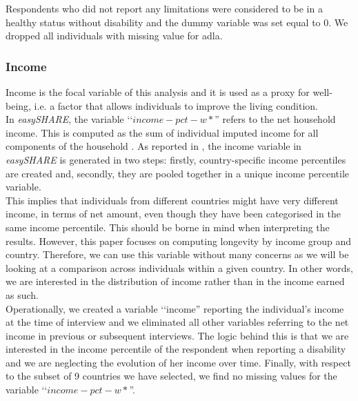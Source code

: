 Respondents who did not report any limitations were considered to be in a healthy status without disability and the dummy variable was set equal to 0. We dropped all individuals with missing value for adla.

\subsubsection{Income}

Income is the focal variable of this analysis and it is used as a proxy for well-being, i.e. a factor that allows individuals to improve the living condition.\\



In \textit{easySHARE}, the variable \lq\lq $income-pct-w*$'' refers to the net household income. This is computed as the sum of individual imputed income for all components of the household \citep{Adeline2016SomeIncome}. 
As reported in \cite{Gruber2014GeneratingProgramming}, the income variable in \textit{easySHARE} is generated in two steps: firstly, country-specific income percentiles are created and, secondly, they are pooled together in a unique income percentile variable.\\

This implies that individuals from different countries might have very different income, in terms of net amount, even though they have been categorised in the same income percentile. This should be borne in mind when interpreting the results.
However, this paper focuses on computing longevity by income group and country. Therefore, we can use this variable without many concerns as we will be looking at a comparison across individuals within a given country. In other words, we are interested in the distribution of income rather than in the income earned as such.\\

Operationally, we created a variable \lq\lq income'' reporting the individual's income at the time of interview and we eliminated all other variables referring to the net income in previous or subsequent interviews. The logic behind this is that we are interested in the income percentile of the respondent when reporting a disability and we are neglecting the evolution of her income over time. Finally, with respect to the subset of 9 countries we have selected, we find no missing values for the variable \lq\lq $income-pct-w*$''.\\


